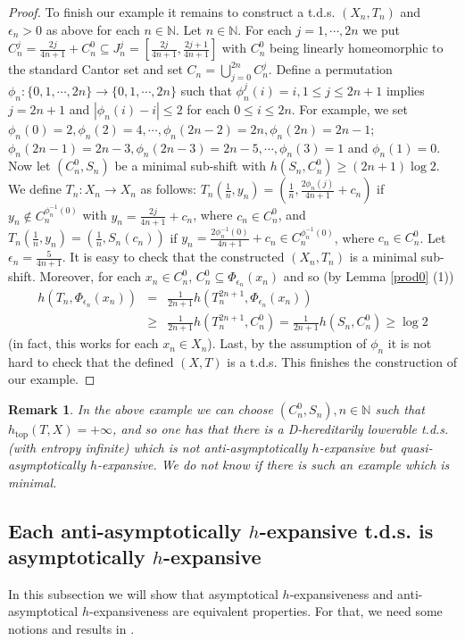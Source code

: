 \documentclass[12pt]{amsart}
\newtheorem{rem}[thm]{Remark}
\theoremstyle{definition} \theoremstyle{question}
\numberwithin{equation}{section}
\begin{document}
\begin{proof}
To finish our example it remains to construct a t.d.s. $(X_n, T_n)$
and $\epsilon_n> 0$ as above for each $n\in {\mathbb N}$. Let $n\in {\mathbb N}$. For
each $j= 1, \cdots, 2 n$ we put $C_n^j= \frac{2 j}{4 n+ 1}+
C_n^0\subseteq J_n^j= [\frac{2 j}{4 n+ 1}, \frac{2 j+ 1}{4 n+ 1}]$
with $C_n^0$ being linearly homeomorphic to the standard Cantor set
and set $C_n= \bigcup_{j= 0}^{2 n} C_n^j$. Define a permutation
$\phi_n: \{0, 1, \cdots, 2 n\}\rightarrow \{0,1,\cdots, 2n\}$ such
that $\phi_n^j (i)= i, 1\le j\le 2 n+ 1$ implies $j= 2 n+ 1$ and
$|\phi_n (i)- i|\le 2$ for each $0\le i\le 2 n$. For example, we set
$\phi_n(0)=2,\phi_n(2)=4, \cdots, \phi_n(2n-2)=2n, \phi_n(2n)=2n-1$;
$\phi_n(2n-1)=2n-3, \phi_n(2n-3)=2n-5, \cdots, \phi_n(3)=1$ and
$\phi_n(1)=0$. Now let $(C_n^0,S_n)$ be a minimal sub-shift with $h
(S_n, C_n^0)\ge (2n+1)\log 2$. We define $T_n:X_n\rightarrow X_n$ as
follows: $T_n(\frac{1}{n}, y_n)=(\frac{1}{n},
\frac{2\phi_n(j)}{4n+1}+c_n)$ if $y_n\not\in C_n^{\phi_n^{- 1} (0)}$
with $y_n=\frac{2j}{4n+1}+c_n$, where $c_n\in C_n^0$, and
$T_n(\frac{1}{n},y_n)=(\frac{1}{n}, S_n(c_n))$ if $y_n=\frac{2
\phi_n^{- 1} (0)}{4n+1}+c_n\in C_n^{\phi_n^{- 1} (0)}$, where
$c_n\in C_n^0$. Let $\epsilon_n=\frac{5}{4n+1}$. It is easy to check
that the constructed $(X_n, T_n)$ is a minimal sub-shift. Moreover,
for each $x_n\in C_n^0$, $C_n^0\subseteq \Phi_{\epsilon_n} (x_n)$
and so (by Lemma \ref{prod0} (1))
\begin{eqnarray*}
h (T_n, \Phi_{\epsilon_n} (x_n))&= & \frac{1}{2 n+ 1} h (T_n^{2 n+
1}, \Phi_{\epsilon_n} (x_n)) \\
&\ge & \frac{1}{2 n+ 1} h (T_n^{2 n+ 1}, C_n^0)= \frac{1}{2 n+ 1} h
(S_n, C_n^0)\ge \log 2
\end{eqnarray*}
(in fact, this works for each $x_n\in X_n$). Last, by the assumption
of $\phi_n$ it is not hard to check that the defined $(X, T)$ is a
t.d.s. This finishes the construction of our example.
\end{proof}

\begin{rem} \label{0905221507}
In the above example we can choose $(C_n^0, S_n), n\in {\mathbb N}$ such that
$h_{\text{top}} (T, X)= +\infty$, and so one has that there is a
D-hereditarily lowerable t.d.s. (with entropy infinite) which is not
anti-asymptotically $h$-expansive but quasi-asymptotically
$h$-expansive. We do not know if there is such an example which is
minimal.
\end{rem}

\subsection{Each anti-asymptotically
$h$-expansive t.d.s. is asymptotically $h$-expansive} In this
subsection we will show that asymptotical $h$-expansiveness and
anti-asymptotical $h$-expansiveness are equivalent properties. For
that, we need some notions and results in \cite{BD}.
\end{document}
